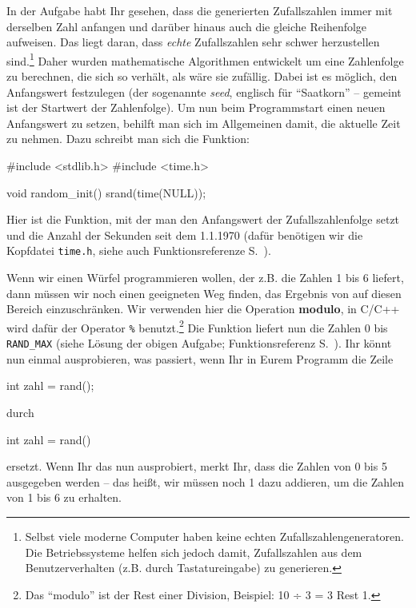 In der Aufgabe habt Ihr gesehen, dass die generierten Zufallszahlen immer mit derselben Zahl anfangen und darüber hinaus auch die gleiche Reihenfolge aufweisen. Das liegt daran, dass \emph{echte} Zufallszahlen sehr schwer herzustellen sind.\footnote{%
    Selbst viele moderne Computer haben keine echten Zufallszahlengeneratoren. Die Betriebssysteme helfen sich jedoch damit, Zufallszahlen aus dem Benutzerverhalten (z.B. durch Tastatureingabe) zu generieren.}
Daher wurden mathematische Algorithmen entwickelt um eine Zahlenfolge zu berechnen, die sich so verhält, als wäre sie zufällig. Dabei ist es möglich, den Anfangswert festzulegen (der sogenannte \emph{seed}, englisch für ``Saatkorn'' -- gemeint ist der Startwert der Zahlenfolge). Um nun beim Programmstart einen neuen Anfangswert zu setzen, behilft man sich im Allgemeinen damit, die aktuelle Zeit zu nehmen. Dazu schreibt man sich die Funktion:
\begin{code}[numbers=none]
#include <stdlib.h>
#include <time.h>

void random_init() {
    srand(time(NULL));
}
\end{code}
Hier ist  die Funktion, mit der man den Anfangswert der Zufallszahlenfolge setzt und  die Anzahl der Sekunden seit dem 1.1.1970 (dafür benötigen wir die Kopfdatei \texttt{time.h}, siehe auch Funktionsreferenze S.~).

Wenn wir einen Würfel programmieren wollen, der z.B. die Zahlen 1 bis 6 liefert, dann müssen wir noch einen geeigneten Weg finden, das Ergebnis von  auf diesen Bereich einzuschränken. Wir verwenden hier die Operation \textbf{modulo}, in C/C++ wird dafür der Operator \texttt{\%} benutzt.\footnote{%
    Das ``modulo'' ist der Rest einer Division, Beispiel: 10 ÷ 3 = 3 Rest 1.}
Die Funktion  liefert nun die Zahlen 0 bis \texttt{RAND\_MAX} (siehe Lösung der obigen Aufgabe; Funktionsreferenz S.~). Ihr könnt nun einmal ausprobieren, was passiert, wenn Ihr in Eurem Programm die Zeile
\begin{code}[numbers=none]
    int zahl = rand();
\end{code} 
durch
\begin{code}[numbers=none]
    int zahl = rand() %
\end{code} 
ersetzt. Wenn Ihr das nun ausprobiert, merkt Ihr, dass die Zahlen von 0 bis 5 ausgegeben werden -- das heißt, wir müssen noch 1 dazu addieren, um die Zahlen von 1 bis 6 zu erhalten. 

